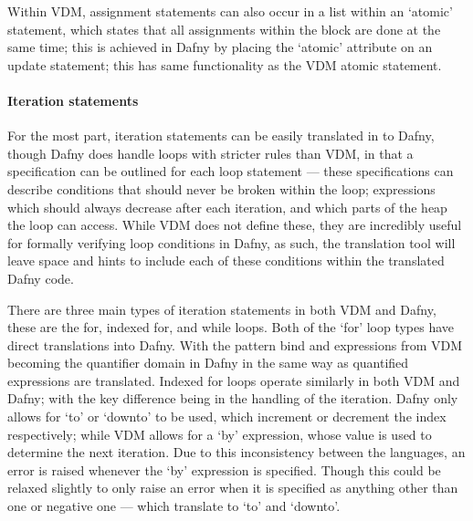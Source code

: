 \documentclass{entcs}
\newcommand{\lfcomment}[1]{\ifthenelse { \boolean{showComments} } {\textcolor{red}{LF:~#1}} { } } %
\begin{document}
Within VDM, assignment statements can also occur in a list within an `atomic' statement, which states that all assignments within the block are done at the same time; this is achieved in Dafny by placing the `atomic' attribute on an update statement; this has same functionality as the VDM atomic statement.

\paragraph{Iteration statements}

For the most part, iteration statements can be easily translated in to Dafny, though Dafny does handle loops with stricter rules than VDM, in that a specification can be outlined for each loop statement --- these specifications can describe conditions that should never be broken within the loop; expressions which should always decrease after each iteration, and which parts of the heap the loop can access. While VDM does not define these, they are incredibly useful for formally verifying loop conditions in Dafny, as such, the translation tool will leave space and hints to include each of these conditions within the translated Dafny code.

There are three main types of iteration statements in both VDM and Dafny, these are the for, indexed for, and while loops. Both of the `for' loop types have direct translations into Dafny. With the pattern bind and expressions from VDM becoming the quantifier domain in Dafny in the same way as quantified expressions are translated. Indexed for loops operate similarly in both VDM and Dafny; with the key difference being in the handling of the iteration. Dafny only allows for `to' or `downto' to be used, which increment or decrement the index respectively; while VDM allows for a `by' expression, whose value is used to determine the next iteration. Due to this inconsistency between the languages, an error is raised whenever the `by' expression is specified. Though this could be relaxed slightly to only raise an error when it is specified as anything other than one or negative one --- which translate to `to' and `downto'.
\end{document}
